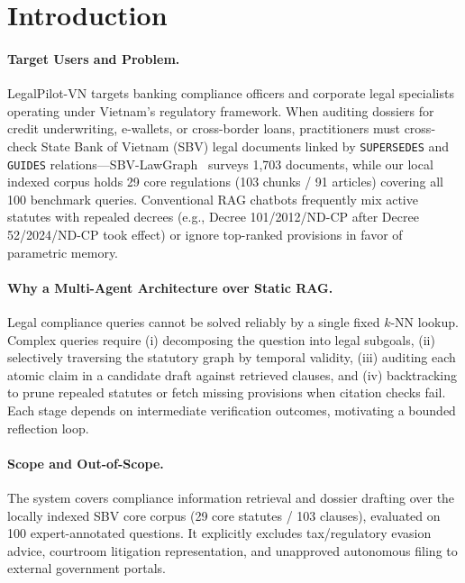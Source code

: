 \documentclass[sigconf,nonacm]{acmart}
\begin{document}
\maketitle

\section{Introduction}
\label{sec:intro}

\paragraph{Target Users and Problem.}
LegalPilot-VN targets banking compliance officers and corporate legal specialists operating under Vietnam's regulatory framework. When auditing dossiers for credit underwriting, e-wallets, or cross-border loans, practitioners must cross-check State Bank of Vietnam (SBV) legal documents linked by \texttt{SUPERSEDES} and \texttt{GUIDES} relations—SBV-LawGraph~\cite{phan2026sbv} surveys 1,703 documents, while our local indexed corpus holds 29 core regulations (103 chunks / 91 articles) covering all 100 benchmark queries. Conventional RAG chatbots frequently mix active statutes with repealed decrees (e.g., Decree 101/2012/ND-CP after Decree 52/2024/ND-CP took effect) or ignore top-ranked provisions in favor of parametric memory.

\paragraph{Why a Multi-Agent Architecture over Static RAG.}
Legal compliance queries cannot be solved reliably by a single fixed $k$-NN lookup. Complex queries require (i) decomposing the question into legal subgoals, (ii) selectively traversing the statutory graph by temporal validity, (iii) auditing each atomic claim in a candidate draft against retrieved clauses, and (iv) backtracking to prune repealed statutes or fetch missing provisions when citation checks fail. Each stage depends on intermediate verification outcomes, motivating a bounded reflection loop.

\paragraph{Scope and Out-of-Scope.}
The system covers compliance information retrieval and dossier drafting over the locally indexed SBV core corpus (29 core statutes / 103 clauses), evaluated on 100 expert-annotated questions. It explicitly excludes tax/regulatory evasion advice, courtroom litigation representation, and unapproved autonomous filing to external government portals.
\end{document}
